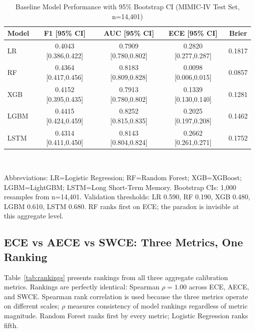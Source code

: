 \documentclass{ieeeaccess}
\begin{document}
\begin{table}[t!]
\caption{Baseline Model Performance with 95\% Bootstrap CI (MIMIC-IV Test Set, n=14,401)}
\label{tab:baseline}
\centering
\footnotesize
\setlength{\tabcolsep}{2pt}
\begin{tabularx}{\columnwidth}{@{}lcccc@{}}
\toprule
\textbf{Model} & \textbf{F1 [95\% CI]} & \textbf{AUC [95\% CI]} & \textbf{ECE [95\% CI]} & \textbf{Brier} \\
\midrule
LR   & 0.4043 [0.386,0.422] & 0.7909 [0.780,0.802] & 0.2820 [0.277,0.287] & 0.1817 \\
RF   & 0.4364 [0.417,0.456] & 0.8183 [0.809,0.828] & 0.0098 [0.006,0.015] & 0.0857 \\
XGB  & 0.4152 [0.395,0.435] & 0.7913 [0.780,0.802] & 0.1339 [0.130,0.140] & 0.1281 \\
LGBM & 0.4415 [0.424,0.459] & 0.8252 [0.815,0.835] & 0.2025 [0.197,0.208] & 0.1462 \\
LSTM & 0.4314 [0.411,0.450] & 0.8143 [0.804,0.824] & 0.2662 [0.261,0.271] & 0.1752 \\
\bottomrule
\end{tabularx}
\\[4pt]
\parbox{\columnwidth}{\footnotesize Abbreviations: LR=Logistic Regression; RF=Random Forest; XGB=XGBoost; LGBM=LightGBM; LSTM=Long Short-Term Memory. Bootstrap CIs: 1,000 resamples from n=14,401. Validation thresholds: LR 0.590, RF 0.190, XGB 0.480, LGBM 0.610, LSTM 0.680. RF ranks first on ECE; the paradox is invisible at this aggregate level.}
\end{table}

\subsection{ECE vs AECE vs SWCE: Three Metrics, One Ranking}

Table~\ref{tab:rankings} presents rankings from all three aggregate calibration metrics. Rankings are perfectly identical: Spearman $\rho=1.00$ across ECE, AECE, and SWCE. Spearman rank correlation is used because the three metrics operate on different scales; $\rho$ measures consistency of model rankings regardless of metric magnitude. Random Forest ranks first by every metric; Logistic Regression ranks fifth.
\end{document}
